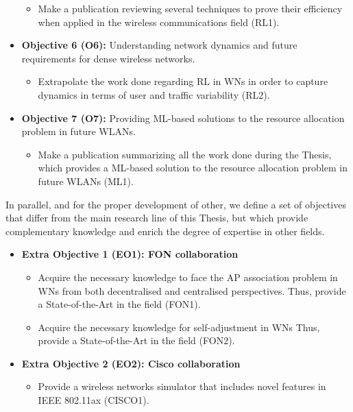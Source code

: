 \documentclass[12pt, a4paper,twoside]{tesi_upf}
\begin{document}
\begin{itemize}
			\begin{itemize}
				\item Make a publication reviewing several techniques to prove their efficiency when applied in the wireless communications field (RL1).
			\end{itemize}		
			\item \textbf{Objective 6 (O6):} Understanding network dynamics and future requirements for dense wireless networks.
			\begin{itemize}
				\item Extrapolate the work done regarding RL in WNs in order to capture dynamics in terms of user and traffic variability (RL2). 
			\end{itemize}		
			\item \textbf{Objective 7 (O7):} Providing ML-based solutions to the resource allocation problem in future WLANs.
			\begin{itemize}
				\item Make a publication summarizing all the work done during the Thesis, which provides a ML-based solution to the resource allocation problem in future WLANs (ML1).
			\end{itemize}		
		\end{itemize}
	
		In parallel, and for the proper development of other, we define a set of objectives that differ from the main research line of this Thesis, but which provide complementary knowledge and enrich the degree of expertise in other fields.
		\begin{itemize}
			\item \textbf{Extra Objective 1 (EO1): FON collaboration} 
			\begin{itemize}
				\item Acquire the necessary knowledge to face the AP association problem in WNs from both decentralised and centralised perspectives. Thus, provide a State-of-the-Art in the field (FON1).
				\item Acquire the necessary knowledge for self-adjustment in WNs Thus, provide a State-of-the-Art in the field (FON2).
			\end{itemize}
			\item \textbf{Extra Objective 2 (EO2): Cisco collaboration} 
			\begin{itemize}
				\item Provide a wireless networks simulator that includes novel features in IEEE 802.11ax (CISCO1).
			\end{itemize}
		\end{itemize}
	
\end{document}
